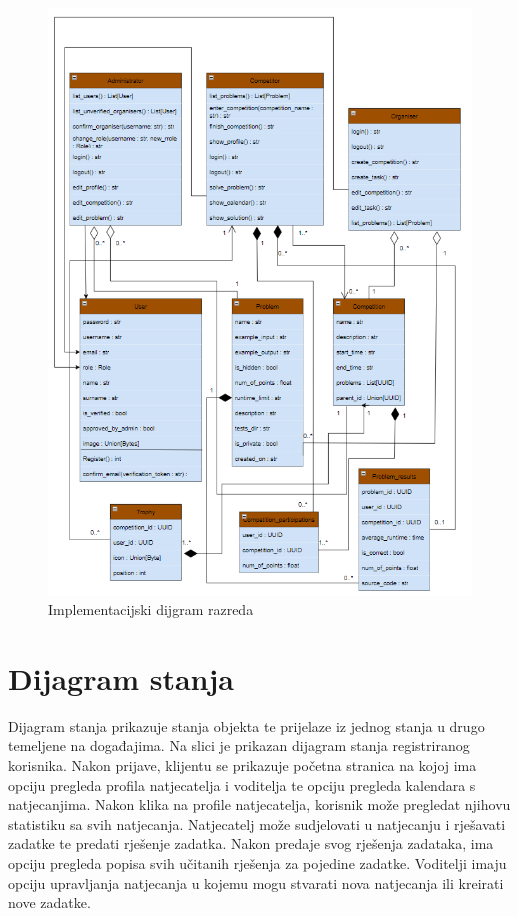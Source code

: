 			\begin{figure}[H]
				\includegraphics[width=\linewidth]{slike/ImplementacijskiDijagramRazreda}
				\centering
				\caption{Implementacijski dijgram razreda}
				\label{fig:implementacija}
			\end{figure}
			
			\eject
		
		\section{Dijagram stanja}

			Dijagram stanja prikazuje stanja objekta te prijelaze iz jednog stanja u drugo temeljene na događajima.
			Na slici je prikazan dijagram stanja registriranog korisnika.
			Nakon prijave, klijentu se prikazuje početna stranica na kojoj ima opciju pregleda profila natjecatelja i voditelja te opciju pregleda kalendara s natjecanjima. Nakon klika na profile natjecatelja, korisnik može pregledat njihovu statistiku sa svih natjecanja. 
			Natjecatelj može sudjelovati u natjecanju i rješavati zadatke te predati rješenje zadatka. Nakon predaje svog rješenja zadataka, ima opciju pregleda popisa svih učitanih rješenja za pojedine zadatke.
			Voditelji imaju opciju upravljanja natjecanja u kojemu mogu stvarati nova natjecanja ili kreirati nove zadatke.
			
